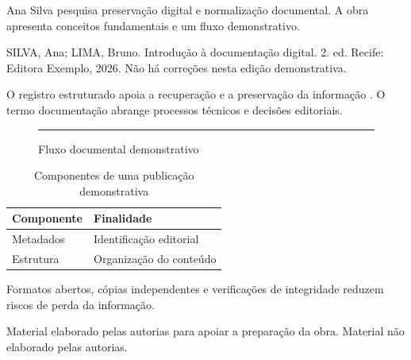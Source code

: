 \documentclass[12pt]{book}
\begin{document}
\ABNTEXlivroexterna
\ABNTEXlivrocapa
\ABNTEXlombada[Volume 1]
\ABNTEXlivrofolhasdeguarda
\ABNTEXlivroorelha
  {Ana Silva pesquisa preservação digital e normalização documental.}
  {A obra apresenta conceitos fundamentais e um fluxo demonstrativo.}

\ABNTEXlivropretextual
{}
\ABNTEXlivrofolhaderosto
\ABNTEXlivrocreditos
\ABNTEXerrata
  {SILVA, Ana; LIMA, Bruno. Introdução à documentação digital. 2. ed.
   Recife: Editora Exemplo, 2026.}
  {Não há correções nesta edição demonstrativa.}
\ABNTEXlistadeilustracoes
\ABNTEXlistadetabelas
{}
\ABNTEXlistadesiglas
\ABNTEXsumario

\ABNTEXlivrotextual
{}
O registro estruturado apoia a recuperação e a preservação da informação
\parencite{associacao2025}. O termo documentação abrange
processos técnicos e decisões editoriais.

\begin{figure}[htbp]
  \centering
  \rule{0.55\textwidth}{3cm}
  \caption{Fluxo documental demonstrativo}
\end{figure}

\begin{table}[htbp]
  \centering
  \caption{Componentes de uma publicação demonstrativa}
  \begin{tabular}{ll}
    \hline
    Componente & Finalidade \\
    \hline
    Metadados & Identificação editorial \\
    Estrutura & Organização do conteúdo \\
    \hline
  \end{tabular}
\end{table}

Formatos abertos, cópias independentes e verificações de integridade reduzem
riscos de perda da informação.

\ABNTEXlivropostextual
{}
\ABNTEXbibliografia
\ABNTEXglossario
{}
Material elaborado pelas autorias para apoiar a preparação da obra.
Material não elaborado pelas autorias.
\end{document}
